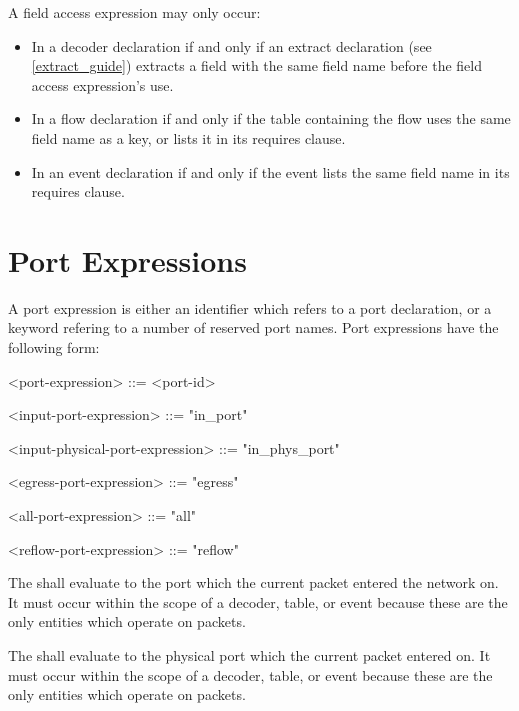 A field access expression may only occur:
\begin{itemize}
\item In a decoder declaration if and only if an extract declaration (see \ref{extract_guide}) extracts a field with the same field name before the field access expression's use.

\item In a flow declaration if and only if the table containing the flow uses the same field name as a key, or lists it in its requires clause.

\item In an event declaration if and only if the event lists the same field name in its requires clause.
\end{itemize}

\section{Port Expressions} \label{port_expr_guide}

A port expression is either an identifier which refers to a port declaration, or a keyword refering to a number of reserved port names. Port expressions have the following form:

\begin{minip}
\begin{grammar}
<port-expression> ::= <port-id>

<input-port-expression> ::= "in_port"

<input-physical-port-expression> ::= "in_phys_port"

<egress-port-expression> ::= "egress"

<all-port-expression> ::= "all"

<reflow-port-expression> ::= "reflow"
\end{grammar}
\end{minip} 

The  shall evaluate to the port which the current packet entered the network on. It must occur within the scope of a decoder, table, or event because these are the only entities which operate on packets.

The  shall evaluate to the physical port which the current packet entered on. It must occur within the scope of a decoder, table, or event because these are the only entities which operate on packets.

